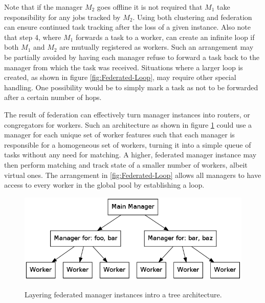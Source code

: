 Note that if the manager $M_2$ goes offline it is not required that $M_1$ take
responsibility for any jobs tracked by $M_2$. Using both clustering and federation
can ensure continued task tracking after the loss of a given instance. Also note that
step 4, where $M_1$ forwards a task to a worker, can create an infinite loop if both
$M_1$ and $M_2$ are mutually registered as workers. Such an arrangement may be partially
avoided by having each manager refuse to forward a task back to the manager from which
the task was received. Situations where a larger loop is created, as shown in figure
\ref{fig:Federated-Loop}, may require other special handling. One possibility would
be to simply mark a task as not to be forwarded after a certain number of hops.

The result of federation can effectively turn manager instances into routers,
or congregators for workers. Such an architecture as shown in figure
\ref{fig:Federated-Tree} could use a manager for each unique set of worker
features such that each manager is responsible for a homogeneous set of workers,
turning it into a simple queue of tasks without any need for matching. A higher,
federated manager instance may then perform matching and track state of a smaller
number of workers, albeit virtual ones. The arrangement in \ref{fig:Federated-Loop}
allows all managers to have access to every worker in the global pool by establishing
a loop. 

\begin{figure}
\includegraphics[width=\columnwidth]{figures/federated_tree}
\label{fig:Federated-Tree}
\caption{Layering federated manager instances intro a tree architecture.}
\end{figure}

